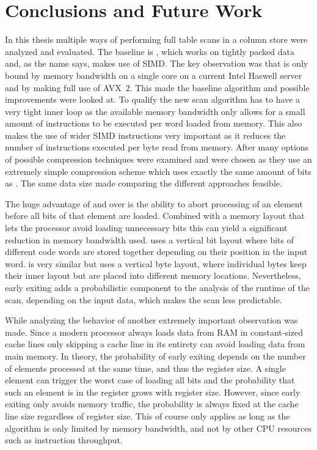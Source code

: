 \chapter{Conclusions and Future Work}
\label{chapter:conclusions}

In this thesis multiple ways of performing full table scans in a column
store were analyzed and evaluated. The baseline is \simdscan{}, which works on
tightly packed data and, as the name says, makes use of SIMD. The key
observation was that \simdscan{} is only bound by memory bandwidth on a single
core on a current Intel Haswell server and by making full use of AVX~2. This
made \simdscan{} the baseline algorithm and possible improvements were looked
at. To qualify the new scan algorithm has to have a very tight inner loop as
the available memory bandwidth only allows for a small amount of instructions
to be executed per word loaded from memory. This also makes the use of wider
SIMD instructions very important as it reduces the number of instructions
executed per byte read from memory. After many options of possible compression
techniques were examined \bwv{} and \bs{} were chosen as they use an extremely
simple compression scheme which uses exactly the same amount of bits as
\simdscan{}. The same data size made comparing the different approaches
feasible.

The huge advantage of \bwv{} and \bs{} over \simdscan{} is the ability to abort
processing of an element before all bits of that element are loaded. Combined
with a memory layout that lets the processor avoid loading unnecessary bits
this can yield a significant reduction in memory bandwidth used. \bwv{} uses a
vertical bit layout where bits of different code words are stored together
depending on their position in the input word. \bs{} is very similar but uses a
vertical byte layout, where individual bytes keep their inner layout but are
placed into different memory locations. Nevertheless, early exiting adds a
probabilistic component to the analysis of the runtime of the scan, depending on
the input data, which makes the scan less predictable.

While analyzing the behavior of \bwv{} another extremely important observation
was made. Since a modern processor always loads data from RAM in constant-sized
cache lines only skipping a cache line in its entirety can avoid loading data
from main memory. In theory, the probability of early exiting depends on the
number of elements processed at the same time, and thus the register size. A
single element can trigger the worst case of loading all bits and the
probability that such an element is in the register grows with register size.
However, since early exiting only avoids memory traffic, the probability is
always fixed at the cache line size regardless of register size. This of course
only applies as long as the algorithm is only limited by memory bandwidth, and
not by other CPU resources such as instruction throughput.

